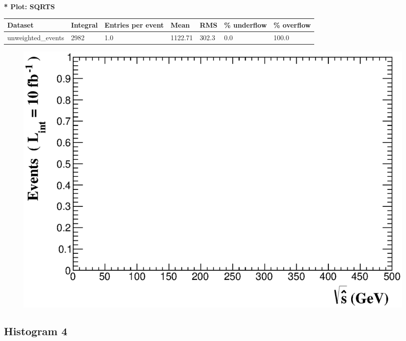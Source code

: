 \documentclass[a4paper, 10pt]{article}
\begin{document}
\textbf{* Plot: SQRTS}\\
   \begin{table}[H]
  \begin{center}
    \begin{tabular}{|m{23.0mm}|m{23.0mm}|m{18.0mm}|m{19.0mm}|m{19.0mm}|m{19.0mm}|m{19.0mm}|}
      \hline
      {\cellcolor{yellow}         Dataset}& {\cellcolor{yellow}         Integral}& {\cellcolor{yellow}         Entries per event}& {\cellcolor{yellow}         Mean}& {\cellcolor{yellow}         RMS}& {\cellcolor{yellow}         \% underflow}& {\cellcolor{yellow}         \% overflow}\\
      \hline
      {\cellcolor{white}         unweighted\_events}& {\cellcolor{white}         2982}& {\cellcolor{white}         1.0}& {\cellcolor{white}         1122.71}& {\cellcolor{white}         302.3}& {\cellcolor{red}         0.0}& {\cellcolor{red}         100.0}\\
\hline
    \end{tabular}
  \end{center}
\end{table}

\begin{figure}[H]
  \begin{center}
    \includegraphics[scale=0.45]{selection_2.eps}\\
\caption{   }
  \end{center}
\end{figure}
      \newpage
\subsection{ Histogram 4}
\end{document}
